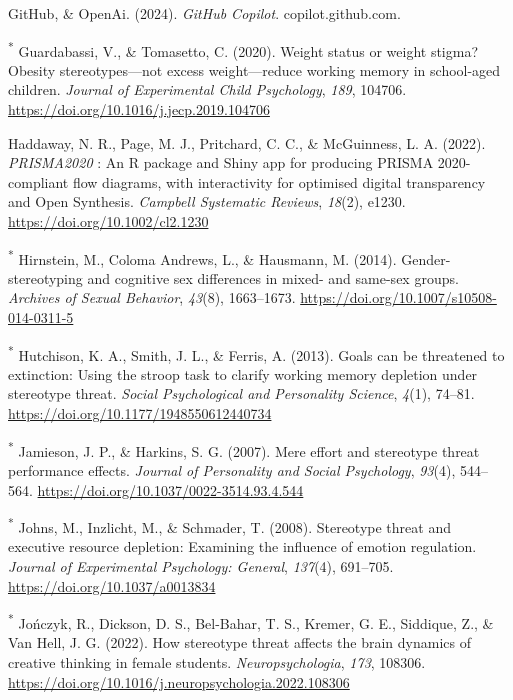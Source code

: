 \documentclass[
  stu,floatsintext]{apa7}
\newlength{\cslhangindent}
\newenvironment{CSLReferences}[2] %
 {\begin{list}{}{%
  \setlength{\itemindent}{0pt}
  \setlength{\leftmargin}{0pt}
  \setlength{\parsep}{0pt}
  \ifodd #1
   \setlength{\leftmargin}{\cslhangindent}
   \setlength{\itemindent}{-1\cslhangindent}
  \fi
  \setlength{\itemsep}{#2\baselineskip}}}
 {\end{list}}
\begin{document}
\begin{CSLReferences}{1}{0}
GitHub, \& OpenAi. (2024). \emph{{GitHub Copilot}}. copilot.github.com.

\textsuperscript{*} Guardabassi, V., \& Tomasetto, C. (2020). Weight status or weight stigma? {Obesity} stereotypes---not excess weight---reduce working memory in school-aged children. \emph{Journal of Experimental Child Psychology}, \emph{189}, 104706. \url{https://doi.org/10.1016/j.jecp.2019.104706}

Haddaway, N. R., Page, M. J., Pritchard, C. C., \& McGuinness, L. A. (2022). {\emph{PRISMA2020}} : {An R} package and {Shiny} app for producing {PRISMA} 2020-compliant flow diagrams, with interactivity for optimised digital transparency and {Open Synthesis}. \emph{Campbell Systematic Reviews}, \emph{18}(2), e1230. \url{https://doi.org/10.1002/cl2.1230}

\textsuperscript{*} Hirnstein, M., Coloma Andrews, L., \& Hausmann, M. (2014). Gender-stereotyping and cognitive sex differences in mixed- and same-sex groups. \emph{Archives of Sexual Behavior}, \emph{43}(8), 1663--1673. \url{https://doi.org/10.1007/s10508-014-0311-5}

\textsuperscript{*} Hutchison, K. A., Smith, J. L., \& Ferris, A. (2013). Goals can be threatened to extinction: {Using} the stroop task to clarify working memory depletion under stereotype threat. \emph{Social Psychological and Personality Science}, \emph{4}(1), 74--81. \url{https://doi.org/10.1177/1948550612440734}

\textsuperscript{*} Jamieson, J. P., \& Harkins, S. G. (2007). Mere effort and stereotype threat performance effects. \emph{Journal of Personality and Social Psychology}, \emph{93}(4), 544--564. \url{https://doi.org/10.1037/0022-3514.93.4.544}

\textsuperscript{*} Johns, M., Inzlicht, M., \& Schmader, T. (2008). Stereotype threat and executive resource depletion: {Examining} the influence of emotion regulation. \emph{Journal of Experimental Psychology: General}, \emph{137}(4), 691--705. \url{https://doi.org/10.1037/a0013834}

\textsuperscript{*} Jończyk, R., Dickson, D. S., Bel-Bahar, T. S., Kremer, G. E., Siddique, Z., \& Van Hell, J. G. (2022). How stereotype threat affects the brain dynamics of creative thinking in female students. \emph{Neuropsychologia}, \emph{173}, 108306. \url{https://doi.org/10.1016/j.neuropsychologia.2022.108306}


\end{CSLReferences}
\end{document}
